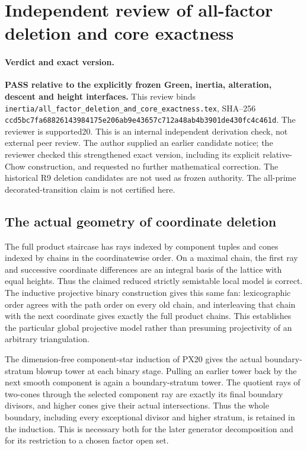 \section{Independent review of all-factor deletion and core exactness}
\label{r20audit:DP20supported}

\paragraph{Verdict and exact version.}
\textbf{PASS relative to the explicitly frozen Green, inertia,
alteration, descent and height interfaces.}
This review binds
\texttt{inertia/all\_factor\_deletion\_and\_core\_exactness.tex},
SHA--256
\texttt{ccd5bc7fa68826143984175e206ab9e43657c712a48ab4b3901de430fc4c461d}.
The reviewer is supported20. This is an internal independent
derivation check, not external peer review. The author supplied an
earlier candidate notice; the reviewer checked this strengthened
exact version, including its explicit relative-Chow construction,
and requested no further mathematical correction. The historical
R9 deletion candidates are not used as frozen authority. The
all-prime decorated-transition claim is not certified here.

\subsection{The actual geometry of coordinate deletion}

The full product staircase has rays indexed by component tuples
and cones indexed by chains in the coordinatewise order. On a
maximal chain, the first ray and successive coordinate differences
are an integral basis of the lattice with equal heights. Thus the
claimed reduced strictly semistable local model is correct.
The inductive projective binary construction gives this same fan:
lexicographic order agrees with the path order on every old chain,
and interleaving that chain with the next coordinate gives exactly
the full product chains. This establishes the particular global
projective model rather than presuming projectivity of an arbitrary
triangulation.

The dimension-free component-star induction of PX20 gives the
actual boundary-stratum blowup tower at each binary stage.
Pulling an earlier tower back by the next smooth component is
again a boundary-stratum tower. The quotient rays of two-cones
through the selected component ray are exactly its final boundary
divisors, and higher cones give their actual intersections. Thus
the whole boundary, including every exceptional divisor and higher
stratum, is retained in the induction. This is necessary both for
the later generator decomposition and for its restriction to a
chosen factor open set.

